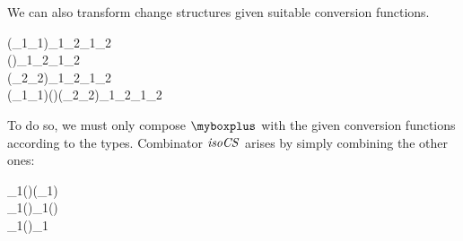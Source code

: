 We can also transform change structures given suitable conversion functions.
\begin{hscode}\SaveRestoreHook
{}%
%
\>[B]{}\mathrel{:\mkern-1mu:}(_{1}\to {}_{1})\to {}\;_{1}\;\;_{2}\to {}\;_{1}\;\;_{2}{}\<[E]%
\\
\>[B]{}\mathrel{:\mkern-1mu:}(\to {})\to {}\;_{1}\;\;_{2}\to {}\;_{1}\;\;_{2}{}\<[E]%
\\
\>[B]{}\mathrel{:\mkern-1mu:}(_{2}\to {}_{2})\to {}\;_{1}\;\;_{2}\to {}\;_{1}\;\;_{2}{}\<[E]%
\\
\>[B]{}\mathrel{:\mkern-1mu:}(_{1}\to {}_{1})\to (\to {})\to (_{2}\to {}_{2})\to {}\;_{1}\;\;_{2}\to {}\;_{1}\;\;_{2}{}\<[E]%
\ColumnHook
\end{hscode}\resethooks
To do so, we must only compose \ensuremath{\myboxplus} with the given conversion functions
according to the types. Combinator \ensuremath{\Varid{isoCS}} arises by simply combining the other ones:
\begin{hscode}\SaveRestoreHook
{}%
%
%
\>[B]{}\;\;\<[18]%
\>[18]{}\mathrel{=}\mathrel{\$}\lambda {}_{1}\;\to (\myboxplus)\;\;(\;_{1})\;\<[E]%
\\
\>[B]{}\;\;\<[18]%
\>[18]{}\mathrel{=}\mathrel{\$}\lambda {}_{1}\;\to (\myboxplus)\;\;_{1}\;(\;){}\<[E]%
\\
\>[B]{}\;\;\<[18]%
\>[18]{}\mathrel{=}\mathrel{\$}\lambda {}_{1}\;\to {}\mathrel{\$}(\myboxplus)\;\;_{1}\;\<[E]%
\\
\>[B]{}\;\;\;\;\<[18]%
\>[18]{}\mathrel{=}\;\mathrel{\$}\;\mathrel{\$}\;\;\<[E]%
\ColumnHook
\end{hscode}\resethooks

